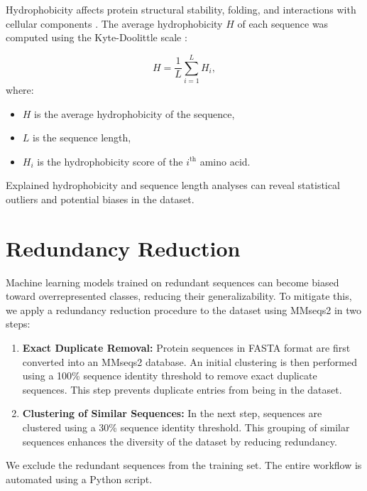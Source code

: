 Hydrophobicity affects protein structural stability, folding, and interactions with cellular components \cite{Baldwin2007}.
The average hydrophobicity $H$ of each sequence was computed using the Kyte-Doolittle scale \cite{Kyte1982}:

\begin{equation}
	H = \frac{1}{L} \sum_{i=1}^{L} H_i,
	\label{eq:hydrophobicity}
\end{equation}
where:
\begin{itemize}
	\item $H$ is the average hydrophobicity of the sequence,
	\item $L$ is the sequence length,
	\item $H_i$ is the hydrophobicity score of the $i^\text{th}$ amino acid.
\end{itemize}

Explained hydrophobicity and sequence length analyses can reveal statistical outliers and potential biases in the dataset.

\section{Redundancy Reduction}
\label{section:redundancy_reduction}

Machine learning models trained on redundant sequences can become biased toward overrepresented classes, reducing their generalizability.
To mitigate this, we apply a redundancy reduction procedure to the dataset using MMseqs2 \cite{steinegger2017mmseqs2} in two steps:


\begin{enumerate}
	\item \textbf{Exact Duplicate Removal:}  
	Protein sequences in FASTA format are first converted into an MMseqs2 database.
	An initial clustering is then performed using a 100\% sequence identity threshold to remove exact duplicate sequences.
	This step prevents duplicate entries from being in the dataset.
	
	\item \textbf{Clustering of Similar Sequences:}  
	In the next step, sequences are clustered using a 30\% sequence identity threshold.
	This grouping of similar sequences enhances the diversity of the dataset by reducing redundancy.
\end{enumerate}

We exclude the redundant sequences from the training set. The entire workflow is automated using a Python script.



